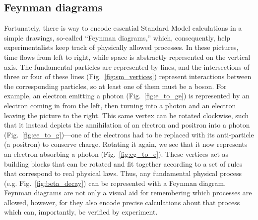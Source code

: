\subsection{Feynman diagrams}
Fortunately, there is way to encode essential Standard Model calculations in a simple drawings, so-called ``Feynman diagrams,'' which, consequently, help experimentalists keep track of physically allowed processes. 
In these pictures, time flows from left to right, while space is abstractly represented on the vertical axis\footnotemark{}. 
The fundamental particles are represented by lines, and the intersections of three or four of these lines (Fig.~\ref{fig:sm_vertices}) represent interactions between the corresponding particles, so at least one of them must be a boson. 
For example, an electron emitting a photon (Fig.~\ref{fig:e_to_ge}) is represented by an electron coming in from the left, then turning into a photon and an electron leaving the picture to the right. 
This same vertex can be rotated clockwise, such that it instead depicts the annihilation of an electron and positron into a photon (Fig.~\ref{fig:ee_to_g})---one of the electrons had to be replaced with its anti-particle (a positron) to conserve charge. 
Rotating it again, we see that it now represents an electron absorbing a photon (Fig.~\ref{fig:eg_to_e}). 
These vertices act as building blocks that can be rotated and fit together according to a set of rules that correspond to real physical laws. 
Thus, any fundamental physical process (e.g. Fig.~\ref{fig:beta_decay}) can be represented with a Feynman diagram. 
Feynman diagrams are not only a visual aid for remembering which processes are allowed, however, for they also encode precise calculations about that process which can, importantly, be verified by experiment.

